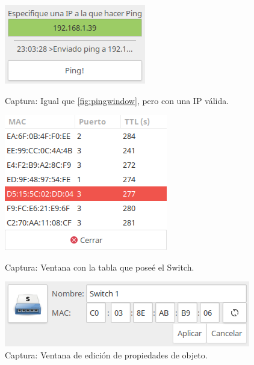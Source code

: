 \documentclass[a4paper, 11pt]{report} %
\begin{document}
\begin{figure}[H]
\centering
\begin{minipage}[t]{0.4\textwidth}
	\centering
	\includegraphics[width=\textwidth]{Resources/Screenshots/2016-09-12-230329_233x131_scrot.png}
	\caption{Captura: Igual que \ref{fig:pingwindow}, pero con una IP válida.}
	\label{fig:pingwindow2}
\end{minipage}
\hspace*{0.15\textwidth}
\begin{minipage}[t]{0.4\textwidth}
	\centering
	\includegraphics[scale=0.6]{Resources/Screenshots/2016-09-12-230428_269x225_scrot.png}
	\caption{Captura: Ventana con la tabla que poseé el Switch.}
	\label{fig:switchingtable}
\end{minipage}

\centering
\begin{minipage}[t]{0.5\textwidth}
	\centering
	\includegraphics[scale=0.6]{Resources/Screenshots/2016-09-13-200254_406x108_scrot.png}
	\caption{Captura: Ventana de edición de propiedades de objeto.}
	\label{fig:editwindow}
\end{minipage}

\end{figure}
\end{document}
